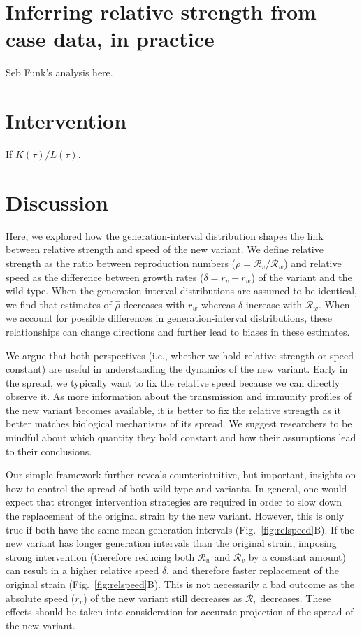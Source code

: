 \documentclass[12pt]{article}
\newcommand{\fref}[1]{Fig.~\ref{fig:#1}}
\newcommand{\RR}{\ensuremath{{\mathcal R}}\xspace}
\begin{document}
\section{Inferring relative strength from case data, in practice}

Seb Funk's analysis here.

\section{Intervention}

If $K(\tau)/L(\tau)$.

\section{Discussion}

Here, we explored how the generation-interval distribution shapes the link between relative strength and speed of the new variant.
We define relative strength as the ratio between reproduction numbers ($\rho=\RR_v/\RR_w$) and relative speed as the difference between growth rates ($\delta=r_v-r_w$) of the variant and the wild type.
When the generation-interval distributions are assumed to be identical, we find that estimates of $\hat{\rho}$ decreases with $r_w$ whereas $\hat{\delta}$ increase with $\RR_w$.
When we account for possible differences in generation-interval distributions, these relationships can change directions and further lead to biases in these estimates.

We argue that both perspectives (i.e., whether we hold relative strength or speed constant) are useful in understanding the dynamics of the new variant.
Early in the spread, we typically want to fix the relative speed because we can directly observe it.
As more information about the transmission and immunity profiles of the new variant becomes available, it is better to fix the relative strength as it better matches biological mechanisms of its spread.
We suggest researchers to be mindful about which quantity they hold constant and how their assumptions lead to their conclusions.

Our simple framework further reveals counterintuitive, but important, insights on how to control the spread of both wild type and variants.
In general, one would expect that stronger intervention strategies are required in order to slow down the replacement of the original strain by the new variant.
However, this is only true if both have the same mean generation intervals (\fref{relspeed}B).
If the new variant has longer generation intervals than the original strain, imposing strong intervention (therefore reducing both $\RR_w$ and $\RR_v$ by a constant amount) can result in a higher relative speed $\delta$, and therefore faster replacement of the original strain (\fref{relspeed}B).
This is not necessarily a bad outcome as the absolute speed ($r_v$) of the new variant still decreases as $\RR_v$ decreases.
These effects should be taken into consideration for accurate projection of the spread of the new variant.
\end{document}
